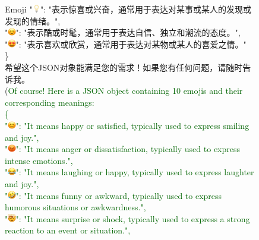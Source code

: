 \begin{figure}[]
{\begin{AIbox}{Emoji}
{{"\includegraphics[height=10pt]{Fig/light-bulb_1f4a1.png}": "表示惊喜或兴奋，通常用于表达对某事或某人的发现或发现的情绪。",\\
"\includegraphics[height=10pt]{Fig/smiling-face-with-smiling-eyes_1f60a.png}": "表示酷或时髦，通常用于表达自信、独立和潮流的态度。",\\
"\includegraphics[height=10pt]{Fig/smiling-face-with-heart-eyes_1f60d.png}": "表示喜欢或欣赏，通常用于表达对某物或某人的喜爱之情。"\\
\} \\
希望这个JSON对象能满足您的需求！如果您有任何问题，请随时告诉我。} \\(\textcolor{darkgreen}{Of course! Here is a JSON object containing 10 emojis and their corresponding meanings:\\
\{\\
"\includegraphics[height=10pt]{Fig/smiling-face-with-smiling-eyes_1f60a.png}": "It means happy or satisfied, typically used to express smiling and joy.", \\
"\includegraphics[height=10pt]{Fig/pouting-face_1f621.png}": "It means anger or dissatisfaction, typically used to express intense emotions.", \\
"\includegraphics[height=10pt]{Fig/face-with-tears-of-joy_1f602.png}": "It means laughing or happy, typically used to express laughter and joy.", \\
"\includegraphics[height=10pt]{Fig/rolling-on-the-floor-laughing_1f923.png}": "It means funny or awkward, typically used to express humorous situations or awkwardness.", \\
"\includegraphics[height=10pt]{Fig/exploding-head_1f92f.png}": "It means surprise or shock, typically used to express a strong reaction to an event or situation.",\\
}}
\end{AIbox}}
\end{figure}
